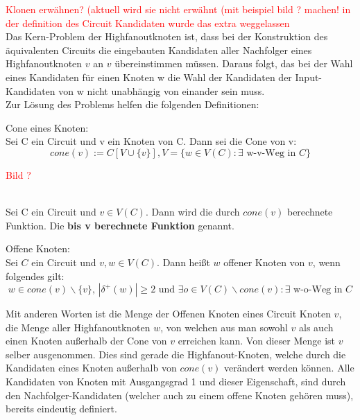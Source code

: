 \documentclass[11pt, a4paper, german]{article}
\begin{document}
\textcolor{red}{Klonen erwähnen? (aktuell wird sie nicht erwähnt (mit beispiel bild ? machen! in der definition des Circuit Kandidaten wurde das extra weggelassen}\\

Das Kern-Problem der Highfanoutknoten ist, dass bei der Konstruktion des äquivalenten Circuits die eingebauten Kandidaten aller Nachfolger eines Highfanoutknoten $v$ an $v$ übereinstimmen müssen. Daraus folgt, das bei der Wahl eines Kandidaten für einen Knoten w die Wahl der Kandidaten der Input-Kandidaten von w nicht unabhängig von einander sein muss. \\
Zur Lösung des Problems helfen die folgenden Definitionen:\\

\begin{definition}{Cone eines Knoten:}\\
	Sei C ein Circuit und v ein Knoten von C. Dann sei die Cone von v: 
	\[ cone(v) := C[V \cup \{ v \}], V = \{ w \in V(C) : \exists \text{ w-v-Weg in }  C \} \] 
\end{definition}
\textcolor{red}{Bild ? }

\begin{definition}\  \\
	Sei C ein Circuit und  $v \in V(C)$. Dann wird die durch $cone(v)$ berechnete Funktion. Die 			{\bf bis v berechnete Funktion} genannt.
\end{definition}

\begin{definition}{Offene Knoten:}\\
	Sei $C$ ein Circuit und $v,w \in V(C)$. Dann heißt $w$ offener Knoten von $v$, wenn folgendes gilt: 
	\[ w \in cone(v)\backslash \{ v \}, \, | \delta ^{+}(w)| \geq 2 \text{ und } \exists o \in V(C) \backslash cone(v) : \exists \text{ w-o-Weg in } C \] 	
\end{definition}
Mit anderen Worten ist die Menge der Offenen Knoten eines Circuit Knoten $v$, die Menge aller Highfanoutknoten $w$, von welchen aus man sowohl $v$ als auch einen Knoten außerhalb der Cone von $v$ erreichen kann. Von dieser Menge ist $v$ selber ausgenommen. Dies sind gerade die Highfanout-Knoten, welche durch die Kandidaten eines Knoten außerhalb von $cone(v)$ verändert werden können. Alle Kandidaten von  Knoten mit Ausgangsgrad 1 und dieser Eigenschaft, sind durch den Nachfolger-Kandidaten (welcher auch zu einem offene Knoten gehören muss), bereits eindeutig definiert. \\
\end{document}
